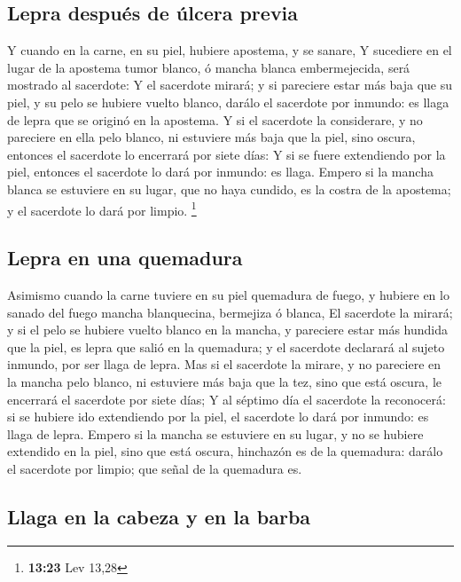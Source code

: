 \hypertarget{lepra-despuuxe9s-de-uxfalcera-previa}{%
\subsection{Lepra después de úlcera
previa}\label{lepra-despuuxe9s-de-uxfalcera-previa}}

 Y cuando en la carne, en su piel, hubiere apostema, y se
sanare,  Y sucediere en el lugar de la apostema tumor
blanco, ó mancha blanca embermejecida, será mostrado al sacerdote:
 Y el sacerdote mirará; y si pareciere estar más baja que
su piel, y su pelo se hubiere vuelto blanco, darálo el sacerdote por
inmundo: es llaga de lepra que se originó en la apostema. 
Y si el sacerdote la considerare, y no pareciere en ella pelo blanco, ni
estuviere más baja que la piel, sino oscura, entonces el sacerdote lo
encerrará por siete días:  Y si se fuere extendiendo por la
piel, entonces el sacerdote lo dará por inmundo: es llaga. 
Empero si la mancha blanca se estuviere en su lugar, que no haya
cundido, es la costra de la apostema; y el sacerdote lo dará por limpio.
\footnote{\textbf{13:23} Lev 13,28}

\hypertarget{lepra-en-una-quemadura}{%
\subsection{Lepra en una quemadura}\label{lepra-en-una-quemadura}}

 Asimismo cuando la carne tuviere en su piel quemadura de
fuego, y hubiere en lo sanado del fuego mancha blanquecina, bermejiza ó
blanca,  El sacerdote la mirará; y si el pelo se hubiere
vuelto blanco en la mancha, y pareciere estar más hundida que la piel,
es lepra que salió en la quemadura; y el sacerdote declarará al sujeto
inmundo, por ser llaga de lepra.  Mas si el sacerdote la
mirare, y no pareciere en la mancha pelo blanco, ni estuviere más baja
que la tez, sino que está oscura, le encerrará el sacerdote por siete
días;  Y al séptimo día el sacerdote la reconocerá: si se
hubiere ido extendiendo por la piel, el sacerdote lo dará por inmundo:
es llaga de lepra.  Empero si la mancha se estuviere en su
lugar, y no se hubiere extendido en la piel, sino que está oscura,
hinchazón es de la quemadura: darálo el sacerdote por limpio; que señal
de la quemadura es.

\hypertarget{llaga-en-la-cabeza-y-en-la-barba}{%
\subsection{Llaga en la cabeza y en la
barba}\label{llaga-en-la-cabeza-y-en-la-barba}}

